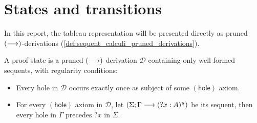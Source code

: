 \documentclass[twoside]{report}
\begin{document}







\section{States and transitions}
\label{sec:tableau_states_and_transitions}

In this report, the tableau representation will be presented directly as pruned $(\longrightarrow)$-derivations (\cref{def:sequent_calculi_pruned_derivations}).

\begin{definition}
\label{def:tableau_states}
A proof state is a pruned $(\longrightarrow)$-derivation $\mathcal D$ containing only well-formed sequents, with regularity conditions:
\begin{itemize}
    \item Every hole in $\mathcal D$ occurs exactly once as subject of some $(\mathsf{hole})$ axiom.
    \item For every $(\mathsf{hole})$ axiom in $\mathcal D$, let $(\Sigma; \Gamma \longrightarrow ({?x} : A)^u)$ be its sequent, then every hole in $\Gamma$ precedes ${?x}$ in $\Sigma$.
\end{itemize}
\end{definition}
\end{document}

